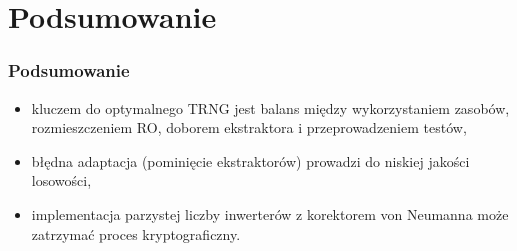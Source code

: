 \documentclass{beamer}
\begin{document}
\section{Podsumowanie}
\begin{frame}
\frametitle{Podsumowanie}

\Large

\begin{itemize}
    \item kluczem do optymalnego TRNG jest balans między wykorzystaniem zasobów, rozmieszczeniem RO, doborem ekstraktora i przeprowadzeniem testów,
    \item błędna adaptacja (pominięcie ekstraktorów) prowadzi do niskiej jakości losowości,
    \item implementacja parzystej liczby inwerterów z korektorem von Neumanna może zatrzymać proces kryptograficzny.
\end{itemize}

\end{frame}
\begin{frame}
\frametitle{}
\end{frame}
\end{document}
